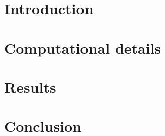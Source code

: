 

\title{\titletext}



    \maketitle

    \section{Introduction}
        \label{sec:introduction}
        

    \section{Computational details}
        \label{sec:computational}
        

    \section{Results}
        \label{sec:results}
        

    \section{Conclusion}
        \label{sec:conclusion}
        

    
    

